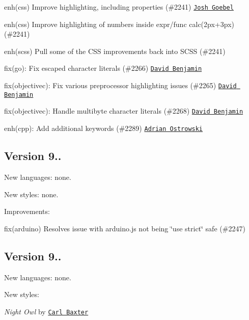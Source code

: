 \begin{DoxyItemize}
\item enh(css) Improve  highlighting, including properties (\#2241) \href{https://github.com/yyyc514}{\tt Josh Goebel}
\item enh(css) Improve highlighting of numbers inside expr/func {\ttfamily calc(2px+3px)} (\#2241)
\item enh(scss) Pull some of the C\+SS improvements back into S\+C\+SS (\#2241)
\item fix(go)\+: Fix escaped character literals (\#2266) \href{https://github.com/davidben}{\tt David Benjamin}
\item fix(objectivec)\+: Fix various preprocessor highlighting issues (\#2265) \href{https://github.com/davidben}{\tt David Benjamin}
\item fix(objectivec)\+: Handle multibyte character literals (\#2268) \href{https://github.com/davidben}{\tt David Benjamin}
\item enh(cpp)\+: Add additional keywords (\#2289) \href{https://github.com/aostrowski}{\tt Adrian Ostrowski}
\end{DoxyItemize}

\subsection*{Version 9..}

New languages\+: none.

New styles\+: none.

Improvements\+:
\begin{DoxyItemize}
\item fix(arduino) Resolves issue with arduino.\+js not being \char`\"{}use strict\char`\"{} safe (\#2247)
\end{DoxyItemize}

\subsection*{Version 9..}

New languages\+: none.

New styles\+:
\begin{DoxyItemize}
\item {\itshape Night Owl} by \href{https://github.com/cdbax}{\tt Carl Baxter}
\end{DoxyItemize}

